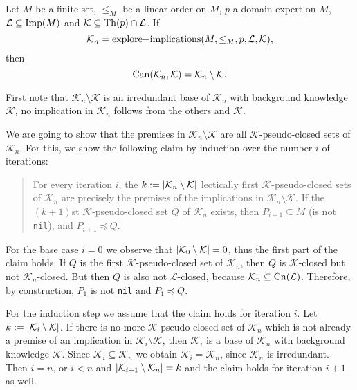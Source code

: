 \begin{Theorem}
  \label{thm:explore-implications-computes-canonical-base}
  Let $M$ be a finite set, $\leq_{M}$ be a linear order on $M$, $p$ a domain expert on
  $M$, $\mathcal{L} \subseteq \operatorname{Imp}(M)$ and $\mathcal{K} \subseteq \operatorname{Th}(p) \cap
  \mathcal{L}$.  If
  \begin{equation*}
    \mathcal{K}_{n} = \text{\lstinline{explore-implications}}(M, \leq_{M}, p, \mathcal{L}, \mathcal{K}),
  \end{equation*}
  then
  \begin{equation*}
    \operatorname{Can}(\mathcal{K}_{n}, \mathcal{K}) = \mathcal{K}_{n} \setminus \mathcal{K}.
  \end{equation*}
\end{Theorem}
\begin{Proof}
  First note that $\mathcal{K}_{n} \setminus \mathcal{K}$ is an irredundant base of
  $\mathcal{K}_{n}$ with background knowledge $\mathcal{K}$, \ie no implication in
  $\mathcal{K}_{n}$ follows from the others and $\mathcal{K}$.

  We are going to show that the premises in $\mathcal{K}_{n} \setminus \mathcal{K}$ are
  all $\mathcal{K}$-pseudo-closed sets of $\mathcal{K}_{n}$.  For this, we show the
  following claim by induction over the number $i$ of iterations:
  \begin{quote}
    For every iteration $i$, the $k := \lvert \mathcal{K}_{n} \setminus \mathcal{K} \rvert$
    lectically first $\mathcal{K}$-pseudo-closed sets of $\mathcal{K}_{n}$ are precisely
    the premises of the implications in $\mathcal{K}_{n} \setminus \mathcal{K}$.  If the
    $(k+1)$st $\mathcal{K}$-pseudo-closed set $Q$ of $\mathcal{K}_{n}$ exists, then
    $P_{i+1} \subseteq M$ (\ie is not \lstinline{nil}), and $P_{i+1} \preceq Q$.
  \end{quote}

  For the base case $i = 0$ we observe that $\lvert \mathcal{K}_{0} \setminus \mathcal{K} \rvert
  = 0$, thus the first part of the claim holds.  If $Q$ is the first
  $\mathcal{K}$-pseudo-closed set of $\mathcal{K}_{n}$, then $Q$ is $\mathcal{K}$-closed
  but not $\mathcal{K}_{n}$-closed.  But then $Q$ is also not $\mathcal{L}$-closed,
  because $\mathcal{K}_{n} \subseteq \operatorname{Cn}(\mathcal{L})$.  Therefore, by construction,
  $P_{1}$ is not \lstinline{nil} and $P_{1} \preceq Q$.

  For the induction step we assume that the claim holds for iteration $i$.  Let $k :=
  \lvert \mathcal{K}_{i} \setminus \mathcal{K} \rvert$.  If there is no more
  $\mathcal{K}$-pseudo-closed set of $\mathcal{K}_{n}$ which is not already a premise of
  an implication in $\mathcal{K}_{i} \setminus \mathcal{K}$, then $\mathcal{K}_{i}$ is a
  base of $\mathcal{K}_{n}$ with background knowledge $\mathcal{K}$.  Since
  $\mathcal{K}_{i} \subseteq \mathcal{K}_{n}$ we obtain $\mathcal{K}_{i} =
  \mathcal{K}_{n}$, since $\mathcal{K}_{n}$ is irredundant.  Then $i = n$, or $i < n$ and
  $\lvert \mathcal{K}_{i+1} \setminus \mathcal{K}_{n} \rvert = k$ and the claim holds for
  iteration $i+1$ as well.


\end{Proof}
